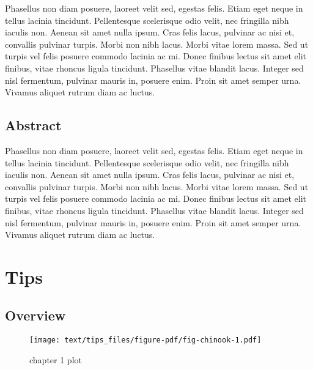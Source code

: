 \documentclass[
  letterpaper,
  oneside]{scrbook}
\begin{document}

Phasellus non diam posuere, laoreet velit sed, egestas felis. Etiam eget
neque in tellus lacinia tincidunt. Pellentesque scelerisque odio velit,
nec fringilla nibh iaculis non. Aenean sit amet nulla ipsum. Cras felis
lacus, pulvinar ac nisi et, convallis pulvinar turpis. Morbi non nibh
lacus. Morbi vitae lorem massa. Sed ut turpis vel felis posuere commodo
lacinia ac mi. Donec finibus lectus sit amet elit finibus, vitae rhoncus
ligula tincidunt. Phasellus vitae blandit lacus. Integer sed nisl
fermentum, pulvinar mauris in, posuere enim. Proin sit amet semper urna.
Vivamus aliquet rutrum diam ac luctus.

\hypertarget{abstract}{%
\section*{Abstract}\label{abstract}}


Phasellus non diam posuere, laoreet velit sed, egestas felis. Etiam eget
neque in tellus lacinia tincidunt. Pellentesque scelerisque odio velit,
nec fringilla nibh iaculis non. Aenean sit amet nulla ipsum. Cras felis
lacus, pulvinar ac nisi et, convallis pulvinar turpis. Morbi non nibh
lacus. Morbi vitae lorem massa. Sed ut turpis vel felis posuere commodo
lacinia ac mi. Donec finibus lectus sit amet elit finibus, vitae rhoncus
ligula tincidunt. Phasellus vitae blandit lacus. Integer sed nisl
fermentum, pulvinar mauris in, posuere enim. Proin sit amet semper urna.
Vivamus aliquet rutrum diam ac luctus.


\hypertarget{tips}{%
\chapter{Tips}\label{tips}}

\hypertarget{overview}{%
\section{Overview}\label{overview}}

\begin{figure}

{\centering \texttt{[image: text/tips\_files/figure-pdf/fig-chinook-1.pdf]}

}

\caption{\label{fig-chinook}chapter 1 plot}

\end{figure}
\end{document}
